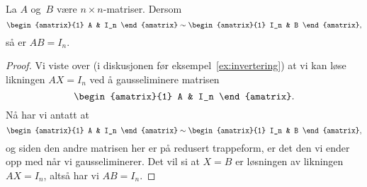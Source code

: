 
\begin{lem}
\label{lem:invers}
La $A$ og~$B$ være $n \times n$-matriser.  Dersom
\[
\begin{amatrix}{1} A & I_n \end{amatrix}
\roweq
\begin{amatrix}{1} I_n & B \end{amatrix},
\]
så er $AB = I_n$.
\end{lem}
\begin{proof}
Vi viste over (i diskusjonen før eksempel~\ref{ex:invertering}) at vi kan
løse likningen $AX = I_n$ ved å gausseliminere matrisen
\[
\begin{amatrix}{1} A & I_n \end{amatrix}.
\]
Nå har vi antatt at
\[
\begin{amatrix}{1} A & I_n \end{amatrix}
\roweq
\begin{amatrix}{1} I_n & B \end{amatrix},
\]
og siden den andre matrisen her er på redusert trappeform, er det den
vi ender opp med når vi gausseliminerer.  Det vil si at $X = B$ er
løsningen av likningen $AX = I_n$, altså har vi $AB = I_n$.
\end{proof}


